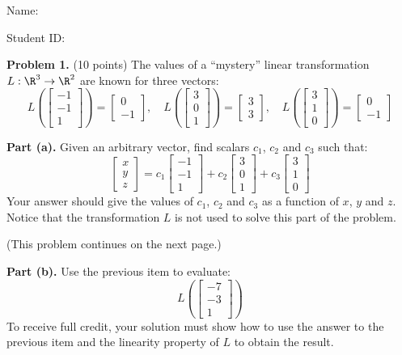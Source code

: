 \documentclass[12pt]{article}
\begin{document}
Name: \hrulefill

\bigskip
Student ID: \hrulefill


\textbf{Problem 1.} (10 points)
The values of a ``mystery'' linear transformation $L:\R^3\to\R^2$ are known for three vectors:
\[
L\left(\left[\begin{matrix}-1\\-1\\1\end{matrix}\right]\right)=\left[\begin{matrix}0\\-1\end{matrix}\right],\quad 
L\left(\left[\begin{matrix}3\\0\\1\end{matrix}\right]\right)=\left[\begin{matrix}3\\3\end{matrix}\right],\quad 
L\left(\left[\begin{matrix}3\\1\\0\end{matrix}\right]\right)=\left[\begin{matrix}0\\-1\end{matrix}\right]
\]

\textbf{Part (a).} Given an arbitrary vector, find scalars $c_1$, $c_2$ and $c_3$ such that:
\[
\begin{bmatrix}x\\y\\z\end{bmatrix}=c_1\left[\begin{matrix}-1\\-1\\1\end{matrix}\right]+c_2\left[\begin{matrix}3\\0\\1\end{matrix}\right]+c_3\left[\begin{matrix}3\\1\\0\end{matrix}\right]
\]
Your answer should give the values of $c_1$, $c_2$ and $c_3$ as a function of $x$, $y$ and $z$. Notice that the transformation $L$ is not used to solve this part of the problem.

\vfill
(This problem continues on the next page.)

\clearpage

\textbf{Part (b).} Use the previous item to evaluate:
\[
L\left(\left[\begin{matrix}-7\\-3\\1\end{matrix}\right]\right)
\]
To receive full credit, your solution must show how to use the answer to the previous item and the linearity property of $L$ to obtain the result. 
\end{document}
